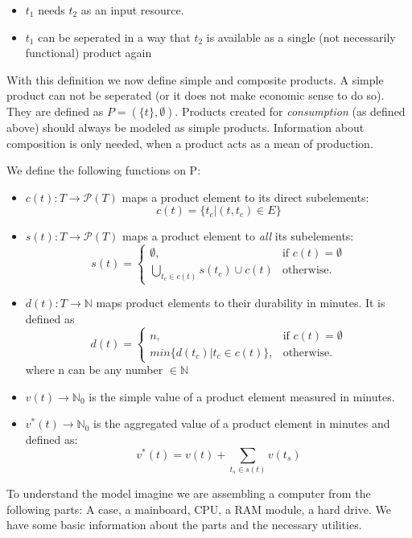 \documentclass[11pt]{article}
\begin{document}
\begin{itemize}
\item $t_1$ needs $t_2$ as an input resource.
\item $t_1$ can be seperated in a way that $t_2$ is available as a single (not necessarily functional) product again
\end{itemize}

With this definition we now define simple and composite products. A simple product can not be seperated (or it does not make economic sense to do so). They are defined as $P=(\{t\}, \emptyset)$. Products created for \emph{consumption} (as defined above) should always be modeled as simple products. Information about composition is only needed, when a product acts as a mean of production.


We define the following functions on P:

\begin{itemize}
\item $c(t): T \rightarrow \mathcal{P}(T) $ maps a product element to its direct subelements:
\begin{equation}
c(t) = \{t_c | (t, t_c) \in E\}
\end{equation} 
\item $s(t): T \rightarrow \mathcal{P}(T)$ maps a product element to \emph{all} its subelements:
\begin{equation}
  s(t)=\begin{cases}
    \emptyset, & \text{if $c(t) = \emptyset$}\\
    \bigcup_{t_c \in c(t)} s(t_c) \cup c(t) & \text{otherwise}.
  \end{cases}
\end{equation}
\item $d(t): T \rightarrow \mathbb{N}$ maps product elements to their durability in minutes. It is defined as
\begin{equation}
  d(t)=\begin{cases}
    n, & \text{if $c(t) = \emptyset$}\\
    min\{d(t_c) | t_c \in c(t)\}, & \text{otherwise}.
  \end{cases}
\end{equation}
where n can be any number $\in \mathbb{N}$
\item $v(t) \rightarrow \mathbb{N}_0$ is the simple value of a product element measured in minutes.
\item $v^*(t) \rightarrow \mathbb{N}_0$ is the aggregated value of a product element in minutes and defined as:
\begin{equation}
  v^*(t)= v(t) + \sum_{t_s \in s(t)} v(t_s)
\end{equation}
\end{itemize}
To understand the model imagine we are assembling a computer from the following parts: A case, a mainboard, CPU, a RAM module, a hard drive. We have some basic information about the parts and the necessary utilities.
\end{document}
